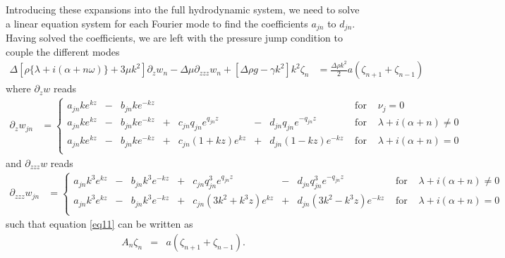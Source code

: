 \documentclass[prfluids]{revtex4-2}
\begin{document}
Introducing these expansions into the full hydrodynamic system, we need to solve
a linear equation system for each Fourier mode to find the coefficients $a_{jn}$
to $d_{jn}$. 
Having solved the coefficients, we are left with the pressure jump
condition to couple the different modes
\begin{align}
  \label{eq11}
  \Delta [\rho\lbrace \lambda + i (\alpha + n\omega)\rbrace + 3 \mu k^2] \partial_z w_n -
  \Delta\mu\partial_{zzz} w_n +
  [\Delta\rho g - \gamma k^2] k^2 \zeta_n
  &= \frac{\Delta\rho k^2}{2} a (\zeta_{n+1}+\zeta_{n-1})
\end{align}
where $\partial_z w$ reads
\begin{align}
  \label{eq12}
  \partial_zw_{jn} &=
  \left\lbrace\begin{array}{rrrrrrrrrr}
    a_{jn}ke^{kz} &-& b_{jn}ke^{-kz}
    &&&&& \text{ for } &\nu_j = 0 \\
    a_{jn}ke^{kz}    &-& b_{jn}ke^{-kz}&+&
    c_{jn}q_{jn} e^{q_{jn}z} &-& d_{jn}q_{jn} e^{-q_{jn}z}
    & \text{ for } &\lambda + i (\alpha + n) \neq 0 \\
    a_{jn}ke^{kz}  &-& b_{jn}ke^{-kz}&+&
    c_{jn}(1 + kz)e^{kz} &+& d_{jn}(1 - kz)e^{-kz}
    & \text{ for } & \lambda + i (\alpha + n) = 0 \\
  \end{array}\right.
\end{align}
and $\partial_{zzz} w$ reads
\begin{align}
  \label{eq13}
  \partial_{zzz}w_{jn} &=
  \left\lbrace\begin{array}{rrrrrrrrrr}
    a_{jn}k^3e^{kz}    &-& b_{jn}k^3e^{-kz}&+&
    c_{jn}q_{jn}^3e^{q_{jn}z} &-& d_{jn}q_{jn}^3e^{-q_{jn}z}
    & \text{ for } &\lambda + i (\alpha + n) \neq 0 \\
    a_{jn}k^3e^{kz}  &-& b_{jn}k^3e^{-kz}&+&
    c_{jn}(3k^2 + k^3z)e^{kz} &+& d_{jn}(3k^2 - k^3z)e^{-kz}
    & \text{ for } & \lambda + i (\alpha + n) = 0 \\
  \end{array}\right.
\end{align}
such that equation \eqref{eq11} can be written as
\begin{eqnarray}
  A_n \zeta_n &=& a (\zeta_{n+1}+\zeta_{n-1}).
\end{eqnarray}
\end{document}
